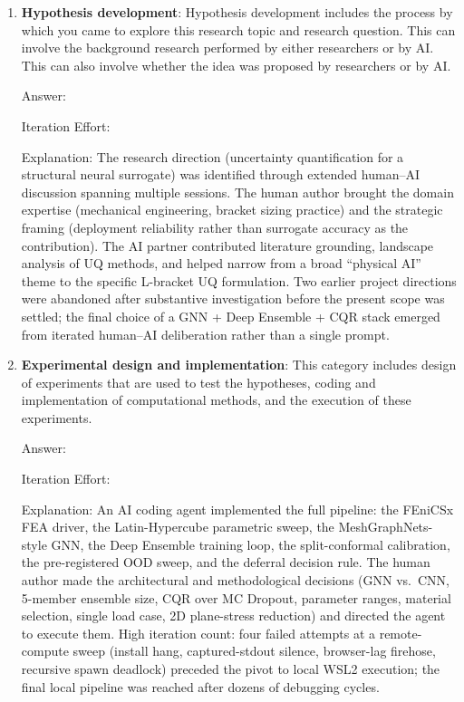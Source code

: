 \documentclass{article}
\begin{document}
\begin{enumerate}

    \item \textbf{Hypothesis development}: Hypothesis development includes the process by which you came to explore this research topic and research question. This can involve the background research performed by either researchers or by AI. This can also involve whether the idea was proposed by researchers or by AI.

    Answer: \involvementB{}

    Iteration Effort: \iterationMedium{}

    Explanation: The research direction (uncertainty quantification for a structural neural surrogate) was identified through extended human--AI discussion spanning multiple sessions. The human author brought the domain expertise (mechanical engineering, bracket sizing practice) and the strategic framing (deployment reliability rather than surrogate accuracy as the contribution). The AI partner contributed literature grounding, landscape analysis of UQ methods, and helped narrow from a broad ``physical AI'' theme to the specific L-bracket UQ formulation. Two earlier project directions were abandoned after substantive investigation before the present scope was settled; the final choice of a GNN + Deep Ensemble + CQR stack emerged from iterated human--AI deliberation rather than a single prompt.

    \item \textbf{Experimental design and implementation}: This category includes design of experiments that are used to test the hypotheses, coding and implementation of computational methods, and the execution of these experiments.

    Answer: \involvementC{}

    Iteration Effort: \iterationHigh{}

    Explanation: An AI coding agent implemented the full pipeline: the FEniCSx FEA driver, the Latin-Hypercube parametric sweep, the MeshGraphNets-style GNN, the Deep Ensemble training loop, the split-conformal calibration, the pre-registered OOD sweep, and the deferral decision rule. The human author made the architectural and methodological decisions (GNN vs.\ CNN, 5-member ensemble size, CQR over MC Dropout, parameter ranges, material selection, single load case, 2D plane-stress reduction) and directed the agent to execute them. High iteration count: four failed attempts at a remote-compute sweep (install hang, captured-stdout silence, browser-lag firehose, recursive spawn deadlock) preceded the pivot to local WSL2 execution; the final local pipeline was reached after dozens of debugging cycles.


\end{enumerate}
\end{document}

